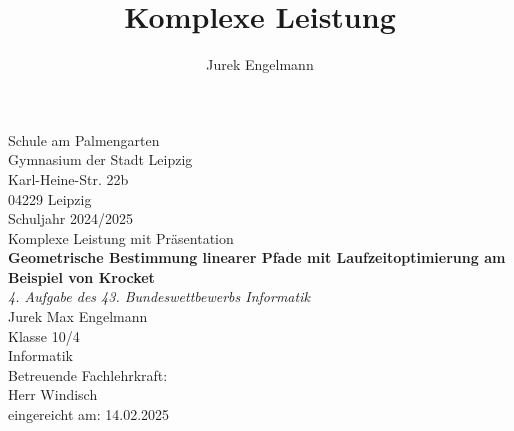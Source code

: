 \documentclass[12pt]{article}
\title{Komplexe Leistung}
\author{Jurek Engelmann}
\begin{document}

\begin{titlepage}
	\centering

	Schule am Palmengarten\\
		Gymnasium der Stadt Leipzig\\
		Karl-Heine-Str. 22b\\
		04229 Leipzig\\[1.5cm]
	
	\large Schuljahr 2024/2025\\[1.5cm]
	
	Komplexe Leistung mit Präsentation\\[1.5cm]

	\huge\textbf{Geometrische Bestimmung linearer Pfade mit Laufzeitoptimierung am Beispiel von Krocket}\\[0.5cm]
	\Large\textit{4. Aufgabe des 43. Bundeswettbewerbs Informatik}\\[2cm]

	\large Jurek Max Engelmann\\
	Klasse 10/4\\[1.5cm]

	Informatik\\[1cm]

	Betreuende Fachlehrkraft:\\
	Herr Windisch\\[1cm]
	

	\normalsize
	eingereicht am: 14.02.2025
	
\end{titlepage}

\renewcommand{\contentsname}{Inhaltsverzeichnis}
\tableofcontents
\newpage


\setcounter{page}{1}  





















\printbibliography[heading=bibnumbered]
\newpage
\thispagestyle{empty}

\end{document}
